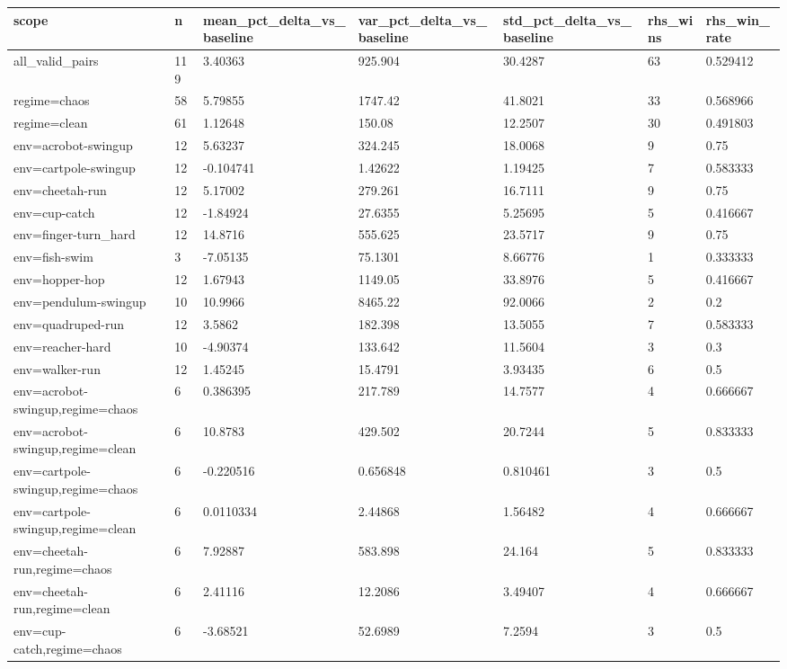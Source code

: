 \begin{tabular}{lllllll}
\toprule
scope & n & mean\_pct\_delta\_vs\_baseline & var\_pct\_delta\_vs\_baseline & std\_pct\_delta\_vs\_baseline & rhs\_wins & rhs\_win\_rate \\
\midrule
all\_valid\_pairs & 119 & 3.40363 & 925.904 & 30.4287 & 63 & 0.529412 \\
regime=chaos & 58 & 5.79855 & 1747.42 & 41.8021 & 33 & 0.568966 \\
regime=clean & 61 & 1.12648 & 150.08 & 12.2507 & 30 & 0.491803 \\
env=acrobot-swingup & 12 & 5.63237 & 324.245 & 18.0068 & 9 & 0.75 \\
env=cartpole-swingup & 12 & -0.104741 & 1.42622 & 1.19425 & 7 & 0.583333 \\
env=cheetah-run & 12 & 5.17002 & 279.261 & 16.7111 & 9 & 0.75 \\
env=cup-catch & 12 & -1.84924 & 27.6355 & 5.25695 & 5 & 0.416667 \\
env=finger-turn\_hard & 12 & 14.8716 & 555.625 & 23.5717 & 9 & 0.75 \\
env=fish-swim & 3 & -7.05135 & 75.1301 & 8.66776 & 1 & 0.333333 \\
env=hopper-hop & 12 & 1.67943 & 1149.05 & 33.8976 & 5 & 0.416667 \\
env=pendulum-swingup & 10 & 10.9966 & 8465.22 & 92.0066 & 2 & 0.2 \\
env=quadruped-run & 12 & 3.5862 & 182.398 & 13.5055 & 7 & 0.583333 \\
env=reacher-hard & 10 & -4.90374 & 133.642 & 11.5604 & 3 & 0.3 \\
env=walker-run & 12 & 1.45245 & 15.4791 & 3.93435 & 6 & 0.5 \\
env=acrobot-swingup,regime=chaos & 6 & 0.386395 & 217.789 & 14.7577 & 4 & 0.666667 \\
env=acrobot-swingup,regime=clean & 6 & 10.8783 & 429.502 & 20.7244 & 5 & 0.833333 \\
env=cartpole-swingup,regime=chaos & 6 & -0.220516 & 0.656848 & 0.810461 & 3 & 0.5 \\
env=cartpole-swingup,regime=clean & 6 & 0.0110334 & 2.44868 & 1.56482 & 4 & 0.666667 \\
env=cheetah-run,regime=chaos & 6 & 7.92887 & 583.898 & 24.164 & 5 & 0.833333 \\
env=cheetah-run,regime=clean & 6 & 2.41116 & 12.2086 & 3.49407 & 4 & 0.666667 \\
env=cup-catch,regime=chaos & 6 & -3.68521 & 52.6989 & 7.2594 & 3 & 0.5 \\

\end{tabular}

